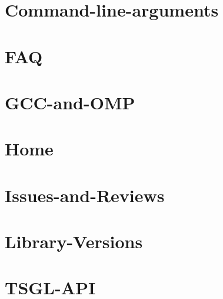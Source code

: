 \documentclass[twoside]{book}
\newcommand{\+}{\discretionary{\mbox{\scriptsize$\hookleftarrow$}}{}{}}
\begin{document}
\chapter{Command-\/line-\/arguments}
\label{md__home_pretzel_workspace_tsgl__t_s_g_l_docs-wiki__command-line-arguments}
\hypertarget{md__home_pretzel_workspace_tsgl__t_s_g_l_docs-wiki__command-line-arguments}{}

\chapter{F\+A\+Q}
\label{md__home_pretzel_workspace_tsgl__t_s_g_l_docs-wiki__f_a_q}
\hypertarget{md__home_pretzel_workspace_tsgl__t_s_g_l_docs-wiki__f_a_q}{}

\chapter{G\+C\+C-\/and-\/\+O\+M\+P}
\label{md__home_pretzel_workspace_tsgl__t_s_g_l_docs-wiki__g_c_c-and-_o_m_p}
\hypertarget{md__home_pretzel_workspace_tsgl__t_s_g_l_docs-wiki__g_c_c-and-_o_m_p}{}

\chapter{Home}
\label{md__home_pretzel_workspace_tsgl__t_s_g_l_docs-wiki__home}
\hypertarget{md__home_pretzel_workspace_tsgl__t_s_g_l_docs-wiki__home}{}

\chapter{Issues-\/and-\/\+Reviews}
\label{md__home_pretzel_workspace_tsgl__t_s_g_l_docs-wiki__issues-and-_reviews}
\hypertarget{md__home_pretzel_workspace_tsgl__t_s_g_l_docs-wiki__issues-and-_reviews}{}

\chapter{Library-\/\+Versions}
\label{md__home_pretzel_workspace_tsgl__t_s_g_l_docs-wiki__library-_versions}
\hypertarget{md__home_pretzel_workspace_tsgl__t_s_g_l_docs-wiki__library-_versions}{}

\chapter{T\+S\+G\+L-\/\+A\+P\+I}
\label{md__home_pretzel_workspace_tsgl__t_s_g_l_docs-wiki__t_s_g_l-_a_p_i}
\hypertarget{md__home_pretzel_workspace_tsgl__t_s_g_l_docs-wiki__t_s_g_l-_a_p_i}{}

\end{document}
